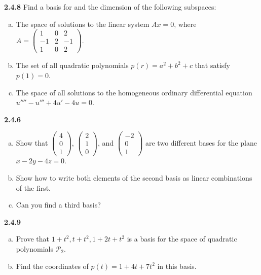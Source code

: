 \documentclass{article}
\begin{document}
\textbf{2.4.8}
Find a basis for and the dimension of the following subspaces:
\begin{enumerate}[(a)]
    \item The space of solutions to the linear system \(Ax = 0\), where \(A = \begin{pmatrix} 1 & 0 & 2 \\ -1 & 2 & -1 \\ 1 & 0 & 2 \end{pmatrix}\).
    \item The set of all quadratic polynomials \(p(r) = a^2 + b^2 + c\) that satisfy \(p(1) = 0\).
    \item The space of all solutions to the homogeneous ordinary differential equation \(u'''' - u''' + 4u' - 4u = 0\).
\end{enumerate}
\vspace{10pt}

\textbf{2.4.6}
\begin{enumerate}[(a)]
    \item Show that \(\begin{pmatrix} 4 \\ 0 \\ 1 \end{pmatrix}\), \(\begin{pmatrix} 2 \\ 1 \\ 0 \end{pmatrix}\), and \(\begin{pmatrix} -2 \\ 0 \\ 1 \end{pmatrix}\) are two different bases for the plane \(x - 2y - 4z = 0\).
    \item Show how to write both elements of the second basis as linear combinations of the first.
    \item Can you find a third basis?
\end{enumerate}
\vspace{10pt}

\textbf{2.4.9}
\begin{enumerate}[(a)]
    \item Prove that \(1 + t^2, t + t^2, 1 + 2t + t^2\) is a basis for the space of quadratic polynomials \(\mathcal{P}_2\).
    \item Find the coordinates of \(p(t) = 1 + 4t + 7t^2\) in this basis.
\end{enumerate}
\vspace{10pt}
\end{document}
